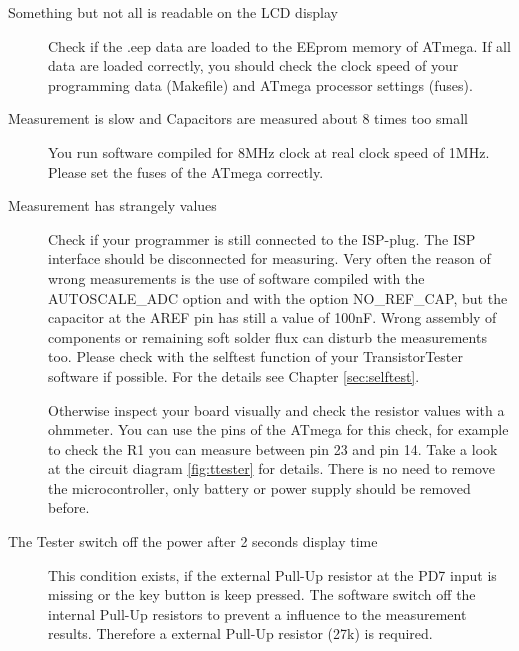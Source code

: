\begin{description}
\item[Something but not all is readable on the LCD display]
Check if the .eep data are loaded to the EEprom memory of ATmega.
If all data are loaded correctly, you should check the clock speed of your
programming data (Makefile) and ATmega processor settings (fuses).

\item[Measurement is slow and Capacitors are measured about 8 times too small]
You run software compiled for 8MHz clock at real clock speed of 1MHz.
Please set the fuses of the ATmega correctly.

\item[Measurement has strangely values]
Check if your programmer is still connected to the ISP-plug.
The ISP interface should be disconnected for measuring.
Very often the reason of wrong measurements is the use of software compiled with
the AUTOSCALE\_ADC option and with the option NO\_REF\_CAP, but the capacitor
at the AREF pin has still a value of 100nF.
Wrong assembly of components or remaining soft solder flux can disturb the 
measurements too. Please check with the selftest function of your TransistorTester software
if possible. For the details see Chapter \ref{sec:selftest}.

Otherwise inspect your board visually and check the resistor values
with a ohmmeter. You can use the pins of the ATmega for this check, for example
to check the R1 you can measure between pin 23 and pin 14. Take a look at the
circuit diagram \ref{fig:ttester} for details. There is no need to
remove the microcontroller, only battery or power supply should be removed before.

\item[The Tester switch off the power after 2 seconds display time] 
This condition exists, if the external Pull-Up resistor at the PD7 input
is missing or the key button is keep pressed.
The software switch off the internal Pull-Up resistors to prevent a influence
to the measurement results. Therefore a external Pull-Up resistor (27k) is required.



\end{description}
